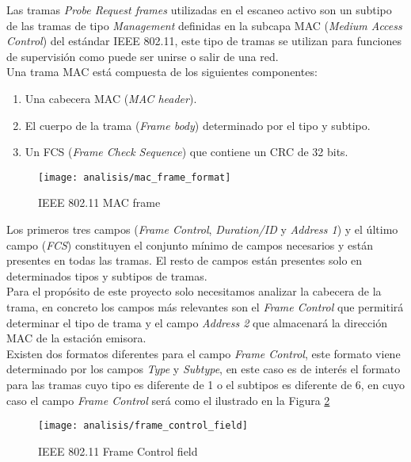 \documentclass[../proyecto.tex]{subfiles}
\begin{document}
Las tramas \textit{Probe Request frames} utilizadas en el escaneo activo son un subtipo de las tramas de tipo \textit{Management} definidas en la subcapa MAC (\textit{Medium Access Control}) del estándar IEEE 802.11, este tipo de tramas se utilizan para funciones de supervisión como puede ser unirse o salir de una red.\\

Una trama MAC está compuesta de los siguientes componentes:
\begin{enumerate}
  \item Una cabecera MAC (\textit{MAC header}).
  \item El cuerpo de la trama (\textit{Frame body}) determinado por el tipo y subtipo.
  \item Un FCS (\textit{Frame Check Sequence}) que contiene un CRC de 32 bits.
\end{enumerate}

\begin{figure}[h!]
\centering
\texttt{[image: analisis/mac\_frame\_format]}
\caption{IEEE 802.11 MAC frame}
\label{fig:ieee80211_mac_frame}
\end{figure}

Los primeros tres campos (\textit{Frame Control}, \textit{Duration/ID} y \textit{Address 1}) y el último campo (\textit{FCS}) constituyen el conjunto mínimo de campos necesarios y están presentes en todas las tramas. El resto de campos están presentes solo en determinados tipos y subtipos de tramas.\\

Para el propósito de este proyecto solo necesitamos analizar la cabecera de la trama, en concreto los campos más relevantes son el \textit{Frame Control} que permitirá determinar el tipo de trama y el campo \textit{Address 2} que almacenará la dirección MAC de la estación emisora.\\

Existen dos formatos diferentes para el campo \textit{Frame Control}, este formato viene determinado por los campos \textit{Type} y \textit{Subtype}, en este caso es de interés el formato para las tramas cuyo tipo es diferente de 1 o el subtipos es diferente de 6, en cuyo caso el campo \textit{Frame Control} será como el ilustrado en la Figura \ref{fig:ieee80211_frame_control_field}

\begin{figure}[h!]
\centering
\texttt{[image: analisis/frame\_control\_field]}
\caption{IEEE 802.11 Frame Control field}
\label{fig:ieee80211_frame_control_field}
\end{figure}
\end{document}
